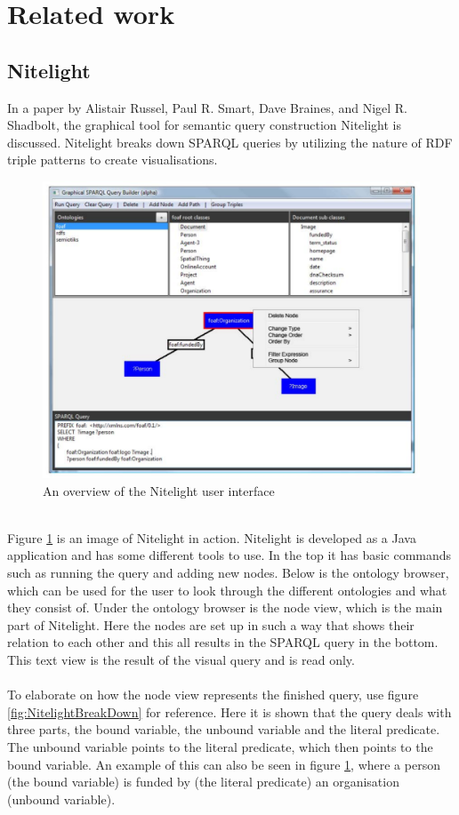 \section{Related work}
\subsection{Nitelight}
In a paper by Alistair Russel, Paul R. Smart, Dave Braines, and Nigel R. Shadbolt\cite{Nitelight}, the graphical tool for semantic query construction Nitelight is discussed. Nitelight breaks down SPARQL queries  by utilizing the nature of RDF triple patterns to create visualisations. 
\begin{figure}[h]
    \centering
  \includegraphics[width=.9\linewidth]{figures/NitelightFigure1.pdf}
  \caption{An overview of the Nitelight user interface\cite{Nitelight}}
  \label{fig:NitelightUI}
\end{figure}
\\
Figure \ref{fig:NitelightUI} is an image of Nitelight in action. Nitelight is developed as a Java application and has some different tools to use. In the top it has basic commands such as running the query and adding new nodes. Below is the ontology browser, which can be used for the user to look through the different ontologies and what they consist of. Under the ontology browser is the node view, which is the main part of Nitelight. Here the nodes are set up in such a way that shows their relation to each other and this all results in the SPARQL query in the bottom. This text view is the result of the visual query and is read only.
\\\\
To elaborate on how the node view represents the finished query, use figure \ref{fig:NitelightBreakDown} for reference. Here it is shown that the query deals with three parts, the bound variable, the unbound variable and the literal predicate. The unbound variable points to the literal predicate, which then points to the bound variable. An example of this can also be seen in figure \ref{fig:NitelightUI}, where a person (the bound variable) is funded by (the literal predicate) an organisation (unbound variable).

